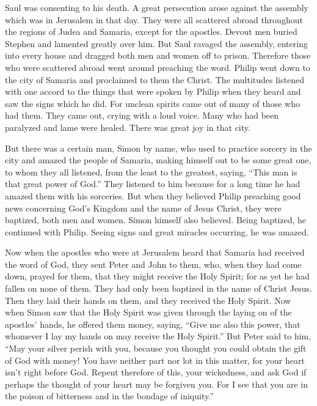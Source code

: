  Saul was consenting to his death. A great persecution arose
against the assembly which was in Jerusalem in that day. They were all
scattered abroad throughout the regions of Judea and Samaria, except for
the apostles.  Devout men buried Stephen and lamented
greatly over him.  But Saul ravaged the assembly, entering
into every house and dragged both men and women off to prison.
 Therefore those who were scattered abroad went around
preaching the word.  Philip went down to the city of Samaria
and proclaimed to them the Christ.  The multitudes listened
with one accord to the things that were spoken by Philip when they heard
and saw the signs which he did.  For unclean spirits came
out of many of those who had them. They came out, crying with a loud
voice. Many who had been paralyzed and lame were healed. 
There was great joy in that city.

 But there was a certain man, Simon by name, who used to
practice sorcery in the city and amazed the people of Samaria, making
himself out to be some great one,  to whom they all
listened, from the least to the greatest, saying, ``This man is that
great power of God.''  They listened to him because for a
long time he had amazed them with his sorceries.  But when
they believed Philip preaching good news concerning God's Kingdom and
the name of Jesus Christ, they were baptized, both men and women.
 Simon himself also believed. Being baptized, he continued
with Philip. Seeing signs and great miracles occurring, he was amazed.

 Now when the apostles who were at Jerusalem heard that
Samaria had received the word of God, they sent Peter and John to them,
 who, when they had come down, prayed for them, that they
might receive the Holy Spirit;  for as yet he had fallen on
none of them. They had only been baptized in the name of Christ Jesus.
 Then they laid their hands on them, and they received the
Holy Spirit.  Now when Simon saw that the Holy Spirit was
given through the laying on of the apostles' hands, he offered them
money,  saying, ``Give me also this power, that whomever I
lay my hands on may receive the Holy Spirit.''  But Peter
said to him, ``May your silver perish with you, because you thought you
could obtain the gift of God with money!  You have neither
part nor lot in this matter, for your heart isn't right before God.
 Repent therefore of this, your wickedness, and ask God if
perhaps the thought of your heart may be forgiven you.  For
I see that you are in the poison of bitterness and in the bondage of
iniquity.''

